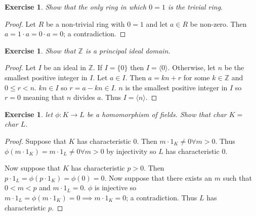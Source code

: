 \documentclass{article}
\newtheorem{exercise}[theorem]{Exercise}
\begin{document}
\begin{exercise}
Show that the only ring in which $0=1$ is the trivial ring.
\end{exercise}
\begin{proof}
Let $R$ be a non-trivial ring with $0=1$ and let $a\in R$ be non-zero. Then $a=1\cdot a=0\cdot a=0$; a contradiction.
\end{proof}

\begin{exercise}
Show that $\mathbb{Z}$ is a principal ideal domain.
\end{exercise}
\begin{proof}
Let $I$ be an ideal in $\mathbb{Z}$. If $I=\{0\}$ then $I=\langle 0\rangle $. Otherwise, let $n$ be the smallest positive integer in $I$. Let $a\in I$. Then $a=kn+r$ for some $k\in\mathbb{Z}$ and $0\leq r<n$. $kn\in I$ so $r=a-kn\in I$. $n$ is the smallest positive integer in $I$ so $r=0$ meaning that $n$ divides $a$. Thus $I=\langle n\rangle$.
\end{proof}

\begin{exercise}
let $\phi:K\to L$ be a homomorphism of fields. Show that char $K=$ char $L$.
\end{exercise}
\begin{proof}
Suppose that $K$ has characteristic $0$. Then $m\cdot 1_K\neq 0\forall m>0$. Thus $\phi(m\cdot 1_K)=m\cdot 1_L\neq0\forall m>0$ by injectivity so $L$ has characteristic $0$.

Now suppose that $K$ has characteristic $p>0$. Then $p\cdot 1_L=\phi(p\cdot 1_K)=\phi(0)=0$. Now suppose that there exists an $m$ such that $0<m<p$ and $m\cdot 1_L=0$. $\phi$ is injective so $m\cdot 1_L=\phi(m\cdot 1_K)=0\implies m\cdot 1_K=0$; a contradiction. Thus $L$ has characteristic $p$.
\end{proof}
\end{document}
